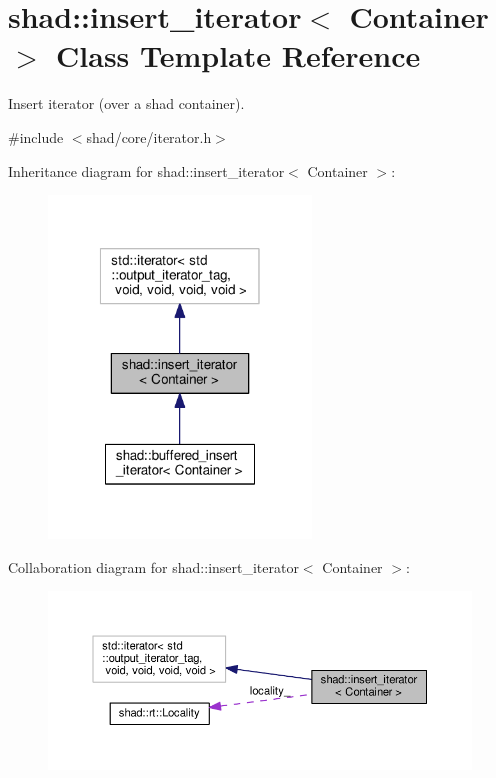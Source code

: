 \hypertarget{classshad_1_1insert__iterator}{\section{shad\-:\-:insert\-\_\-iterator$<$ Container $>$ Class Template Reference}
\label{classshad_1_1insert__iterator}
}


Insert iterator (over a shad container).  




{\ttfamily \#include $<$shad/core/iterator.\-h$>$}



Inheritance diagram for shad\-:\-:insert\-\_\-iterator$<$ Container $>$\-:
\nopagebreak
\begin{figure}[H]
\begin{center}
\leavevmode
\includegraphics[width=198pt]{classshad_1_1insert__iterator__inherit__graph}
\end{center}
\end{figure}


Collaboration diagram for shad\-:\-:insert\-\_\-iterator$<$ Container $>$\-:
\nopagebreak
\begin{figure}[H]
\begin{center}
\leavevmode
\includegraphics[width=350pt]{classshad_1_1insert__iterator__coll__graph}
\end{center}
\end{figure}
